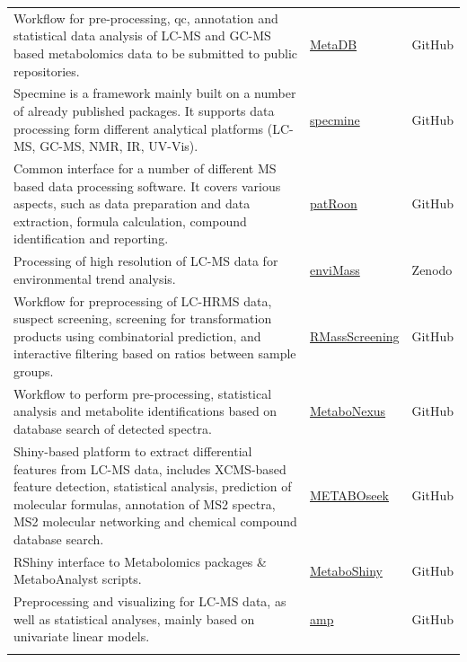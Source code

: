 \documentclass[]{article}
\begin{document}
\begin{longtable}{>{\raggedright\arraybackslash}p{30em}>{\raggedright\arraybackslash}p{10em}>{\raggedright\arraybackslash}p{3em}}
\rowcolor{gray!6}  Workflow for pre-processing, qc, annotation and statistical data analysis of LC-MS and GC-MS based metabolomics data to be submitted to public repositories. & \href{https://github.com/rmylonas/MetaDB}{MetaDB} & GitHub\\
Specmine is a framework mainly built on a number of already published packages. It supports data processing form different analytical platforms (LC-MS, GC-MS, NMR, IR, UV-Vis). & \href{https://github.com/cran/specmine}{specmine} & GitHub\\
\rowcolor{gray!6}  Common interface for a number of different MS based data processing software. It covers various aspects, such as data preparation and data extraction, formula calculation, compound identification and reporting. & \href{https://github.com/rickhelmus/patRoon}{patRoon} & GitHub\\
Processing of high resolution of LC-MS data for environmental trend analysis. & \href{https://zenodo.org/record/1213098}{enviMass} & Zenodo\\
\addlinespace
\rowcolor{gray!6}  Workflow for preprocessing of LC-HRMS data, suspect screening, screening for transformation products using combinatorial prediction, and interactive filtering based on ratios between sample groups. & \href{https://github.com/meowcat/RMassScreening}{RMassScreening} & GitHub\\
Workflow to perform pre-processing, statistical analysis and metabolite identifications based on database search of detected spectra. & \href{https://github.com/tohweizhong/MetaboNexus}{MetaboNexus} & GitHub\\
\rowcolor{gray!6}  Shiny-based platform to extract differential features from LC-MS data, includes XCMS-based feature detection, statistical analysis, prediction of molecular formulas, annotation of MS2 spectra, MS2 molecular networking and chemical compound database search. & \href{https://github.com/mjhelf/METABOseek}{METABOseek} & GitHub\\
RShiny interface to Metabolomics packages {\&} MetaboAnalyst scripts. & \href{https://github.com/UMCUGenetics/MetaboShiny/}{MetaboShiny} & GitHub\\
\rowcolor{gray!6}  Preprocessing and visualizing for LC-MS data, as well as statistical analyses, mainly based on univariate linear models. & \href{https://github.com/antonvsdata/amp}{amp} & GitHub\\*
\end{longtable}

\newpage
\end{document}
